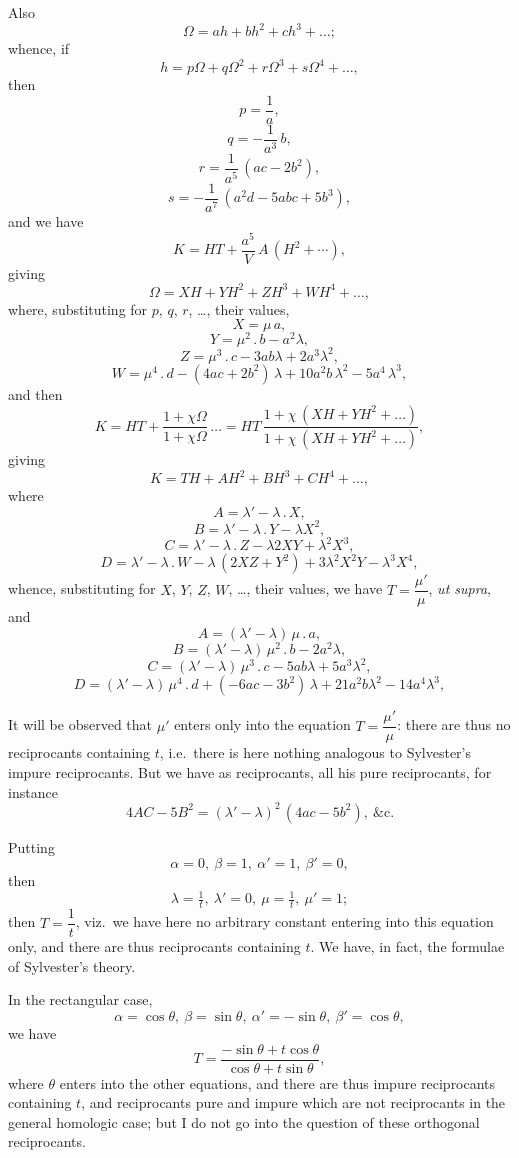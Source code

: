 \documentclass[11pt]{article}
\begin{document}
Also
\[
\Omega = a h + b h^2 + c h^3 + \ldots;
\]
whence, if
\[
h = p\Omega + q\Omega^2 + r\Omega^3 + s\Omega^4 + \ldots,
\]
then
\[
p = \frac{1}{a},
\]
\[
q = -\frac{1}{a^3}\,b,
\]
\[
r = \frac{1}{a^5}\,(a c - 2 b^2),
\]
\[
s = -\frac{1}{a^7}\,(a^2 d - 5 a b c + 5 b^3),
\]
and we have
\[
K = H T + \frac{a^5}{V}\,A\,(H^2 + \cdots),
\]
giving
\[
\Omega = X H + Y H^2 + Z H^3 + W H^4 + \ldots,
\]
where, substituting for $p$, $q$, $r$, \ldots, their values,
\[
X = \mu\,a,
\]
\[
Y = \mu^2\,.\,b - a^2\lambda,
\]
\[
Z = \mu^3\,.\,c - 3 a b\lambda + 2 a^3\lambda^2,
\]
\[
W = \mu^4\,.\,d - (4 a c + 2 b^2)\,\lambda + 10 a^2 b\,\lambda^2 - 5 a^4\,\lambda^3,
\]
and then
\[
K = H T + \frac{1 + \chi\Omega}{1 + \chi\Omega}\,\ldots = H T\,\frac{1 + \chi\,(X H + Y H^2 + \ldots)}{1 + \chi\,(X H + Y H^2 + \ldots)},
\]
giving
\[
K = T H + A H^2 + B H^3 + C H^4 + \ldots,
\]
where
\[
A = \lambda' - \lambda \,.\, X,
\]
\[
B = \lambda' - \lambda \,.\, Y - \lambda X^2,
\]
\[
C = \lambda' - \lambda \,.\, Z - \lambda 2 X Y + \lambda^2 X^3,
\]
\[
D = \lambda' - \lambda \,.\, W - \lambda\,(2 X Z + Y^2) + 3\lambda^2 X^2 Y - \lambda^3 X^4,
\]
whence, substituting for $X$, $Y$, $Z$, $W$, \ldots, their values, we have $T = \dfrac{\mu'}{\mu}$, \emph{ut supra}, and
\[
A = (\lambda' - \lambda)\,\mu\,.\,a,
\]
\[
B = (\lambda' - \lambda)\,\mu^2\,.\,b - 2 a^2\lambda,
\]
\[
C = (\lambda' - \lambda)\,\mu^3\,.\,c - 5 a b\lambda + 5 a^3\lambda^2,
\]
\[
D = (\lambda' - \lambda)\,\mu^4\,.\,d + (-6 a c - 3 b^2)\,\lambda + 21 a^2 b\lambda^2 - 14 a^4\lambda^3,
\]

It will be observed that $\mu'$ enters only into the equation $T = \dfrac{\mu'}{\mu}$: there are thus no reciprocants containing $t$, i.e.\ there is here nothing analogous to Sylvester's impure reciprocants. But we have as reciprocants, all his pure reciprocants, for instance
\[
4 A C - 5 B^2 = (\lambda' - \lambda)^2\,(4 a c - 5 b^2),\ \&\mathrm{c}.
\]

Putting
\[
\alpha = 0,\ \beta = 1,\ \alpha' = 1,\ \beta' = 0,
\]
then
\[
\lambda = \tfrac{1}{t},\ \lambda' = 0,\ \mu = \tfrac{1}{t},\ \mu' = 1;
\]
then $T = \dfrac{1}{t}$, viz.\ we have here no arbitrary constant entering into this equation only, and there are thus reciprocants containing $t$. We have, in fact, the formulae of Sylvester's theory.

In the rectangular case,
\[
\alpha = \cos\theta,\ \beta = \sin\theta,\ \alpha' = -\sin\theta,\ \beta' = \cos\theta,
\]
we have
\[
T = \frac{-\sin\theta + t\cos\theta}{\cos\theta + t\sin\theta},
\]
where $\theta$ enters into the other equations, and there are thus impure reciprocants containing $t$, and reciprocants pure and impure which are not reciprocants in the general homologic case; but I do not go into the question of these orthogonal reciprocants.
\end{document}
